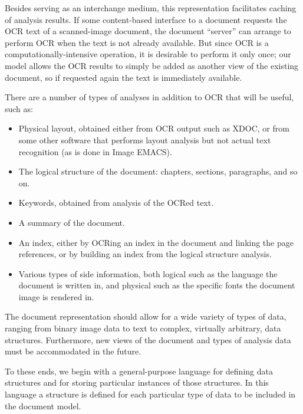 Besides serving as an interchange medium, this representation
facilitates caching of analysis results.  If some content-based
interface to a document requests the OCR text of a scanned-image
document, the document ``server'' can arrange to perform OCR when
the text is not already available.  But since OCR is a
computationally-intensive operation, it is desirable to perform it only
once; our model allows the OCR results to simply be added as another
view of the existing document, so if requested again the text is
immediately available.

There are a number of types of analyses in addition to OCR that will be
useful, such as:
\begin{itemize}
\item
Physical layout, obtained either from OCR output such as XDOC, or from
some other software that performs layout analysis but not actual text
recognition (as is done in Image EMACS).

\item
The logical structure of the document: chapters, sections, paragraphs,
and so on.

\item
Keywords, obtained from analysis of the OCRed text.

\item
A summary of the document.

\item
An index, either by OCRing an index in the document and linking the page
references, or by building an index from the logical structure analysis.

\item
Various types of side information, both logical such as the language the
document is written in, and physical such as the specific fonts
the document image is rendered in.

\end{itemize}

The document representation should allow for a wide variety of types of
data, ranging from binary image data to text to complex, virtually
arbitrary, data structures. 
Furthermore, new views of the document and types of analysis data must
be accommodated in the future.

To these ends, we begin with a general-purpose language for defining
data structures and for storing particular instances of those
structures.
In this language a structure is defined for each particular type of data
to be included in the document model.  

